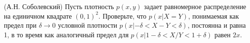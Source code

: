 \begin{problem}(А.Н. Соболевский)
Пусть плотность $p(x,y)$ задает равномерное распределение на единичном квадрате $(0, 1)^2$. Проверьте, что $p(x | X = Y )$, понимаемая как предел при $\delta \to 0$ условной плотности $p(x | -\delta < X - Y <  \delta)$, постоянна и равна 1, в то время как аналогичный предел для $p (x | 1 - \delta < X/Y < 1 + \delta)$ равен $2x$. 
\end{problem}



\begin{comment}
\begin{problem}[распределение Коши]
Радиоактивный источник испускает 
частицы в случайном направлении (при этом все направления равновероятны). 
Источник находится на расстоянии $d$ от фотопластины, которая представляет 
собой бесконечную вертикальную плоскость.

\begin{enumerate}
\item При условии, что частица попадает в плоскость, покажите, что 
горизонтальная координата точки попадания (если начало координат выбирается 
в точке, ближайшей к источнику) имеет плотность распределения:
\[
p\left( x \right)=\frac{d}{\pi \left( {d^2+x^2} \right)}.
\]
Это распределение известно как \textit{распределение Коши}.

\item Можно ли вычислить среднее (математическое ожидание) этого 
распределения?
\end{enumerate}
\end{problem}
\end{comment}
